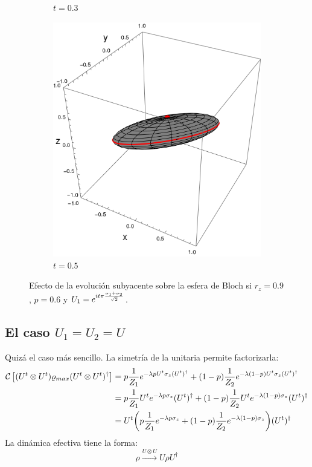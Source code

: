 \begin{figure}[h!]
\begin{subfigure}{0.32\textwidth}
      \caption{$t=0.3$}
    \end{subfigure}
    \begin{subfigure}{0.32\textwidth}
      \centering
      \includegraphics[width=0.9\linewidth]{maxent/figures/U1xU2_H1=Pi(sx+sy)_H2=Id_z=0.9_p=0.6t=0.5.png}
      \caption{$t=0.5$}
    \end{subfigure}
    \caption{Efecto de la evolución subyacente sobre la esfera de Bloch si $r_{z}=0.9$, $p=0.6$ y $U_{1}=e^{it\pi \frac{\sigma_{1}+\sigma_{2}}{\sqrt{2}}}$.}
    \label{fig:SxSySequence}
\end{figure}

\subsection{El caso $U_{1}=U_{2}=U$}

Quizá el caso más sencillo. La simetría de la unitaria permite factorizarla:
\begin{align*}
\mathcal{C}\left[(U^{t}\otimes U^{t})\varrho_{max}(U^{t}\otimes U^{t})^{\dag}\right]&=p\frac{1}{Z_{1}}e^{-\lambda p U^{t}\sigma_{z}(U^t)^{\dag}}+(1-p)\frac{1}{Z_{2}}e^{-\lambda (1-p)U^{t}\sigma_{z}(U^t)^{\dag}}\\
&=p\frac{1}{Z_{1}}U^{t}e^{-\lambda p \sigma_{z}}(U^t)^{\dag}+(1-p)\frac{1}{Z_{2}}U^{t}e^{-\lambda (1-p)\sigma_{z}}(U^t)^{\dag}\\
&=U^{t}\qty(p\frac{1}{Z_{1}}e^{-\lambda p \sigma_{z}}+(1-p)\frac{1}{Z_{2}}e^{-\lambda (1-p)\sigma_{z}})(U^t)^{\dag}\\
\end{align*}
La dinámica efectiva tiene la forma:
\begin{equation}
    \rho\xrightarrow{U\otimes U}U\rho U^{\dagger}
\end{equation}


